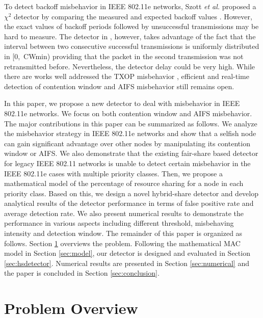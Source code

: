 \documentclass[conference]{IEEEtran}
\begin{document}
To detect backoff misbehavior in IEEE 802.11e networks, Szott \emph{et al.} proposed a $\chi^2$ detector by comparing the measured and expected backoff values \cite{szott2011detecting}. However, the exact values of backoff periods followed by unsuccessful transmissions may be hard to measure. The detector in \cite{serrano2010detecting}, however, takes advantage of the fact that the interval between two consecutive successful transmissions is uniformly distributed in [0,~CWmin) providing that the packet in the second transmission was not retransmitted before. Nevertheless, the detector delay could be very high. While there are works well addressed the TXOP misbehavior \cite{ahn2011fair}, efficient and real-time detection of contention window and AIFS misbehavior still remains open.

In this paper, we propose a new detector to deal with misbehavior in IEEE 802.11e networks. We focus on both contention window and AIFS misbehavior. The major contributions in this paper can be summarized as follows. We analyze the misbehavior strategy in IEEE 802.11e networks and show that a selfish node can gain significant advantage over other nodes by manipulating its contention window or AIFS. We also demonstrate that the existing fair-share based detector for legacy IEEE 802.11 networks is unable to detect certain misbehavior in the IEEE 802.11e cases with multiple priority classes. Then, we propose a mathematical model of the percentage of resource sharing for a node in each priority class. Based on this, we design a novel hybrid-share detector and develop analytical results of the detector performance in terms of false positive rate and average detection rate. We also present numerical results to demonstrate the performance in various aspects including different threshold, misbehaving intensity and detection window. The remainder of this paper is organized as follows. Section \ref{sec:overview} overviews the problem. Following the mathematical MAC model in Section \ref{sec:model}, our detector is designed and evaluated in Section \ref{sec:hsdetector}. Numerical results are presented in Section \ref{sec:numerical} and the paper is concluded in Section \ref{sec:conclusion}.


\section{Problem Overview} \label{sec:overview}
\end{document}
